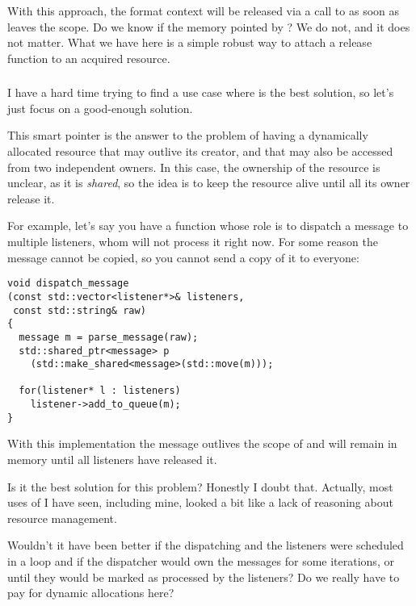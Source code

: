 With this approach, the format context will be released via a call to
 as soon as
 leaves the scope. Do we know if the memory
pointed by ? We do not, and it does not
matter. What we have here is a simple robust way to attach a release
function to an acquired resource.

\subsubsection{}

I have a hard time trying to find a use case where
 is the best solution, so let's just focus on a
good-enough solution.

This smart pointer is the answer to the problem of having a
dynamically allocated resource that may outlive its creator, and that
may also be accessed from two independent owners. In this case, the
ownership of the resource is unclear, as it is \emph{shared}, so the
idea is to keep the resource alive until all its owner release it.

For example, let's say you have a function whose role is to dispatch a
message to multiple listeners, whom will not process it right now. For
some reason the message cannot be copied, so you cannot send a copy of
it to everyone:

\begin{lstlisting}
void dispatch_message
(const std::vector<listener*>& listeners,
 const std::string& raw)
{
  message m = parse_message(raw);
  std::shared_ptr<message> p
    (std::make_shared<message>(std::move(m)));

  for(listener* l : listeners)
    listener->add_to_queue(m);
}
\end{lstlisting}

With this implementation the message outlives the scope of
 and will remain in memory until all
listeners have released it.

Is it the best solution for this problem? Honestly I doubt
that. Actually, most uses of  I have seen,
including mine, looked a bit like a lack of reasoning about resource
management.

Wouldn't it have been better if the dispatching and the listeners were
scheduled in a loop and if the dispatcher would own the messages for
some iterations, or until they would be marked as processed by the
listeners? Do we really have to pay for dynamic allocations here?

